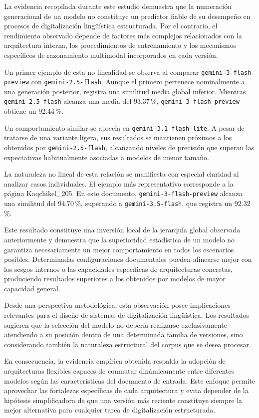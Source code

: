 La evidencia recopilada durante este estudio demuestra que la numeración generacional de un modelo no constituye un predictor fiable de su desempeño en procesos de digitalización lingüística estructurada. Por el contrario, el rendimiento observado depende de factores más complejos relacionados con la arquitectura interna, los procedimientos de entrenamiento y los mecanismos específicos de razonamiento multimodal incorporados en cada versión.

Un primer ejemplo de esta no linealidad se observa al comparar \texttt{gemini-3-flash-preview} con \texttt{gemini-2.5-flash}. Aunque el primero pertenece nominalmente a una generación posterior, registra una similitud media global inferior. Mientras \texttt{gemini-2.5-flash} alcanza una media del 93.37\,\%, \texttt{gemini-3-flash-preview} obtiene un 92.44\,\%.

Un comportamiento similar se aprecia en \texttt{gemini-3.1-flash-lite}. A pesar de tratarse de una variante ligera, sus resultados se mantienen próximos a los obtenidos por \texttt{gemini-2.5-flash}, alcanzando niveles de precisión que superan las expectativas habitualmente asociadas a modelos de menor tamaño.

La naturaleza no lineal de esta relación se manifiesta con especial claridad al analizar casos individuales. El ejemplo más representativo corresponde a la página Kaqchikel\_205. En este documento, \texttt{gemini-3-flash-preview} alcanza una similitud del 94.70\,\%, superando a \texttt{gemini-3.5-flash}, que registra un 92.32\,\%.

Este resultado constituye una inversión local de la jerarquía global observada anteriormente y demuestra que la superioridad estadística de un modelo no garantiza necesariamente un mejor comportamiento en todos los escenarios posibles. Determinadas configuraciones documentales pueden alinearse mejor con los sesgos internos o las capacidades específicas de arquitecturas concretas, produciendo resultados superiores a los obtenidos por modelos de mayor capacidad general.

Desde una perspectiva metodológica, esta observación posee implicaciones relevantes para el diseño de sistemas de digitalización lingüística. Los resultados sugieren que la selección del modelo no debería realizarse exclusivamente atendiendo a su posición dentro de una determinada familia de versiones, sino considerando también la naturaleza estructural del corpus que se desea procesar.

En consecuencia, la evidencia empírica obtenida respalda la adopción de arquitecturas flexibles capaces de conmutar dinámicamente entre diferentes modelos según las características del documento de entrada. Este enfoque permite aprovechar las fortalezas específicas de cada arquitectura y evita depender de la hipótesis simplificadora de que una versión más reciente constituye siempre la mejor alternativa para cualquier tarea de digitalización estructurada.

